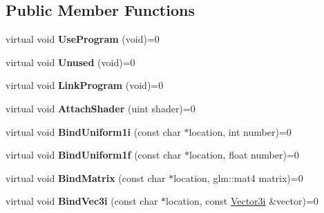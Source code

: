 \subsection*{Public Member Functions}
\begin{DoxyCompactItemize}
\item 
\hypertarget{classEngine_1_1IShader_a5b790df387d044b86556bcc9f61953ea}{}virtual void {\bfseries Use\+Program} (void)=0\label{classEngine_1_1IShader_a5b790df387d044b86556bcc9f61953ea}

\item 
\hypertarget{classEngine_1_1IShader_a979b8b793e0431d5f25421778c8f8fcf}{}virtual void {\bfseries Unused} (void)=0\label{classEngine_1_1IShader_a979b8b793e0431d5f25421778c8f8fcf}

\item 
\hypertarget{classEngine_1_1IShader_a40cd920be17e3bb211f22ee3c71560f6}{}virtual void {\bfseries Link\+Program} (void)=0\label{classEngine_1_1IShader_a40cd920be17e3bb211f22ee3c71560f6}

\item 
\hypertarget{classEngine_1_1IShader_a36e24542bc551a7ce2d5d60f7c23e304}{}virtual void {\bfseries Attach\+Shader} (uint shader)=0\label{classEngine_1_1IShader_a36e24542bc551a7ce2d5d60f7c23e304}

\item 
\hypertarget{classEngine_1_1IShader_a8999bac5bb0d4dc4a0a4e950be9b1262}{}virtual void {\bfseries Bind\+Uniform1i} (const char $\ast$location, int number)=0\label{classEngine_1_1IShader_a8999bac5bb0d4dc4a0a4e950be9b1262}

\item 
\hypertarget{classEngine_1_1IShader_a6b5824382ab0c62691c9b656b09d105d}{}virtual void {\bfseries Bind\+Uniform1f} (const char $\ast$location, float number)=0\label{classEngine_1_1IShader_a6b5824382ab0c62691c9b656b09d105d}

\item 
\hypertarget{classEngine_1_1IShader_aab732a9285162e51cb06bc722af5aa61}{}virtual void {\bfseries Bind\+Matrix} (const char $\ast$location, glm\+::mat4 matrix)=0\label{classEngine_1_1IShader_aab732a9285162e51cb06bc722af5aa61}

\item 
\hypertarget{classEngine_1_1IShader_aa61545153ee0887922e41de4d884a238}{}virtual void {\bfseries Bind\+Vec3i} (const char $\ast$location, const \hyperlink{classVector3}{Vector3i} \&vector)=0\label{classEngine_1_1IShader_aa61545153ee0887922e41de4d884a238}


\end{DoxyCompactItemize}
